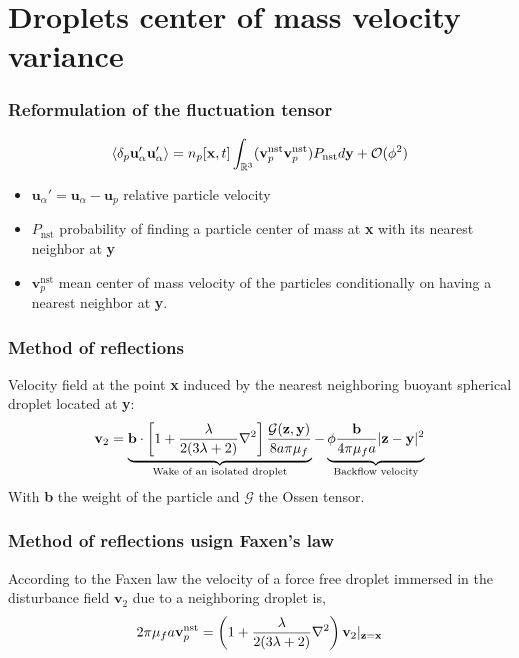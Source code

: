 \documentclass{sintefbeamer}
\begin{document}



\section{Droplets center of mass velocity variance}

\begin{frame}
  \frametitle{Reformulation of the fluctuation tensor }

  \begin{equation}
    \left<\delta_p \textbf{u}_\alpha'\textbf{u}_\alpha'\right>
    = 
    n_p[\textbf{x},t]
    \int_{\mathbb{R}^3}
    (\textbf{v}^\text{nst}_p
    \textbf{v}^\text{nst}_p)
    P_\text{nst}
    d\textbf{y}
    + 
    \mathcal{O}(\phi^2)
\end{equation}
\begin{itemize}
  \item $\textbf{u}_\alpha' = \textbf{u}_\alpha - \textbf{u}_p$ relative particle velocity
  \item $P_\text{nst}$ probability of finding a particle center of mass at \textbf{x} with its nearest neighbor at \textbf{y}
  \item $\textbf{v}^\text{nst}_p$ mean center of mass velocity of the particles conditionally on having a nearest neighbor at \textbf{y}. 
\end{itemize}
\end{frame}
\begin{frame}
  \frametitle{Method of reflections}
Velocity field at the point \textbf{x} induced by the nearest neighboring buoyant spherical droplet located at \textbf{y}: 
  \begin{equation}
    \textbf{v}_2 = 
    \underbrace{\textbf{b} \cdot \left[
        1
        + \frac{\lambda}{2(3\lambda +2)}\mathbf{\nabla}^2
    \right]\frac{\mathcal{G}(\textbf{z},\textbf{y})}{8a\pi\mu_f}}_\text{Wake of an isolated droplet}
    - 
    \underbrace{\phi \frac{\textbf{b}}{4 \pi \mu_f a} |\textbf{z} - \textbf{y}|^2}_\text{Backflow velocity}
\end{equation}
With \textbf{b} the weight of the particle and $\mathcal{G}$ the Ossen tensor. 

\end{frame}
\begin{frame}
  \frametitle{Method of reflections usign Faxen's law}
According to the Faxen law the velocity of a force free droplet immersed in the disturbance field $\textbf{v}_2$ due to a neighboring droplet is, 
\begin{align}
  2 \pi \mu_f a \textbf{v}_p^\text{nst}
  = \left(1 + \frac{\lambda}{2(3\lambda +2)}\mathbf{\nabla}^2\right)\textbf{v}_2|_{\textbf{z} = \textbf{x}}
\end{align}
\end{frame}
\end{document}
